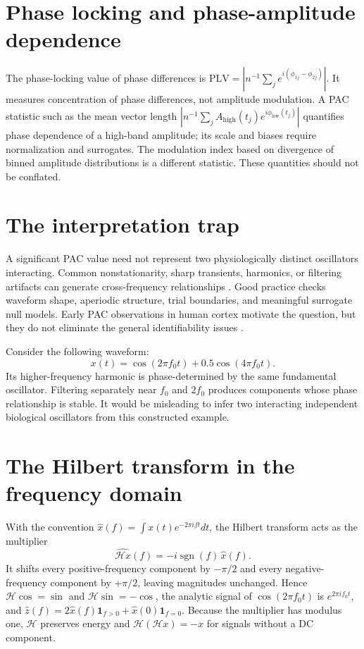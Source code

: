 \section{Phase locking and phase-amplitude dependence}
The phase-locking value of phase differences is $\mathrm{PLV}=|n^{-1}\sum_j e^{i(\phi_{1j}-\phi_{2j})}|$. It measures concentration of phase differences, not amplitude modulation. A PAC statistic such as the mean vector length $|n^{-1}\sum_j A_{\mathrm{high}}(t_j)e^{i\phi_{\mathrm{low}}(t_j)}|$ quantifies phase dependence of a high-band amplitude; its scale and biases require normalization and surrogates. The modulation index based on divergence of binned amplitude distributions is a different statistic. These quantities should not be conflated.

\section{The interpretation trap}
A significant PAC value need not represent two physiologically distinct oscillators interacting. Common nonstationarity, sharp transients, harmonics, or filtering artifacts can generate cross-frequency relationships \cite{Aru2015}. Good practice checks waveform shape, aperiodic structure, trial boundaries, and meaningful surrogate null models. Early PAC observations in human cortex motivate the question, but they do not eliminate the general identifiability issues \cite{Canolty2006}.

\begin{workedexample}
Consider the following waveform:
\[x(t)=\cos(2\pi f_0 t)+0.5\cos(4\pi f_0 t).\]
Its higher-frequency harmonic is phase-determined by the same fundamental oscillator. Filtering separately near $f_0$ and $2f_0$ produces components whose phase relationship is stable. It would be misleading to infer two interacting independent biological oscillators from this constructed example.
\end{workedexample}
\section{The Hilbert transform in the frequency domain}
With the convention $\hat x(f)=\int x(t)e^{-2\pi ift}dt$, the Hilbert transform acts as the multiplier
\[
\widehat{\mathcal Hx}(f)=-i\operatorname{sgn}(f)\,\hat x(f).
\]
It shifts every positive-frequency component by $-\pi/2$ and every negative-frequency component by $+\pi/2$, leaving magnitudes unchanged. Hence $\mathcal H\cos=\sin$ and $\mathcal H\sin=-\cos$, the analytic signal of $\cos(2\pi f_0t)$ is $e^{2\pi if_0t}$, and $\widehat z(f)=2\hat x(f)\mathbf 1_{f>0}+\hat x(0)\mathbf 1_{f=0}$. Because the multiplier has modulus one, $\mathcal H$ preserves energy and $\mathcal H(\mathcal Hx)=-x$ for signals without a DC component.

